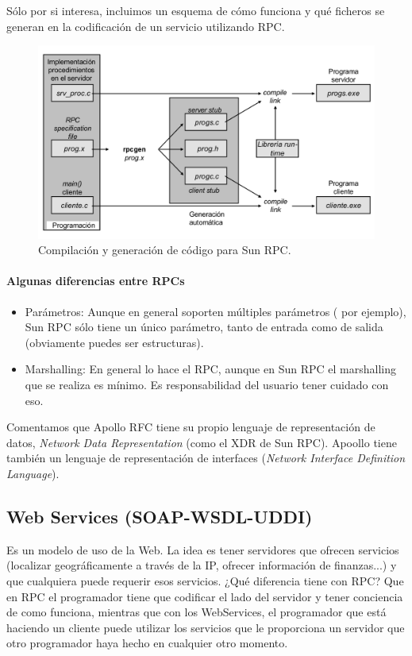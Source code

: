 Sólo por si interesa, incluimos un esquema de cómo funciona y qué ficheros se generan en la codificación de un servicio utilizando RPC.


\begin{figure}[htb]
\centering
\includegraphics[width=1\textwidth]{img/SUNRPC.png}
\caption{Compilación y generación de código para Sun RPC.}
\label{SunRPC}
\end{figure}

\paragraph{Algunas diferencias entre RPCs}
\begin{itemize}
	\item Parámetros: Aunque en general soporten múltiples parámetros ( por ejemplo), Sun RPC sólo tiene un único parámetro, tanto de entrada como de salida (obviamente puedes ser estructuras).
	\item Marshalling: En general lo hace el RPC, aunque en Sun RPC el marshalling que se realiza es mínimo. Es responsabilidad del usuario tener cuidado con eso.
\end{itemize}

Comentamos que Apollo RFC tiene su propio lenguaje de representación de datos, \textit{Network Data Representation}  (como el XDR de Sun RPC). Apoollo tiene también un lenguaje de representación de interfaces  (\textit{Network Interface Definition Language}).

\subsection{Web Services (SOAP-WSDL-UDDI)}
Es un modelo de uso de la Web. La idea es tener servidores que ofrecen servicios (localizar geográficamente a través de la IP, ofrecer información de finanzas...) y que cualquiera puede requerir esos servicios. ¿Qué diferencia tiene con RPC? Que en RPC el programador tiene que codificar el lado del servidor y tener conciencia de como funciona, mientras que con los WebServices, el programador que está haciendo un cliente puede utilizar los servicios que le proporciona un servidor que otro programador haya hecho en cualquier otro momento.

